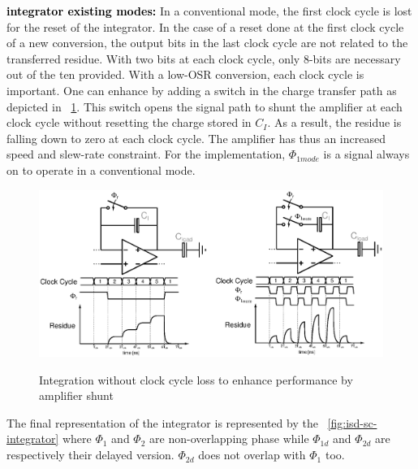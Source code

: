 \textbf{\textcolor{black}{integrator existing modes:}}
In a conventional mode, the first clock cycle is lost for the reset of the integrator. In the case of a reset done at the first clock cycle of a new conversion, the output bits in the last clock cycle are not related to the transferred residue. With two bits at each clock cycle, only 8-bits are necessary out of the ten provided. With a low-OSR conversion, each clock cycle is important. One can enhance by adding a switch in the charge transfer path as depicted in \figurename~\ref{fig:sigma-delta-modes-integration}. This switch opens the signal path to shunt the amplifier at each clock cycle without resetting the charge stored in $C_I$. As a result, the residue is falling down to zero at each clock cycle. The amplifier has thus an increased speed and slew-rate constraint. For the implementation, \(\Phi_{1mode} \) is a signal always on to operate in a conventional mode.

\begin{figure}[htp]
	\centering
	\includegraphics[width=\textwidth]{Chapter4/Figs/sigma-delta-modes-integration.ps}
	\begin{subfigure}[b]{0.48\textwidth}
		\centering
	\end{subfigure}
	\begin{subfigure}[b]{0.48\textwidth}
		\centering
	\end{subfigure}
	\caption{Integration without clock cycle loss to enhance performance by amplifier shunt}
	\label{fig:sigma-delta-modes-integration}
\end{figure}

The final representation of the integrator is represented by the \figurename~\ref{fig:isd-sc-integrator} where \(\Phi_1 \) and \(\Phi_2 \) are non-overlapping phase while \(\Phi_{1d} \) and \(\Phi_{2d} \) are respectively their delayed version. \(\Phi_{2d} \) does not overlap with \(\Phi_1 \) too.

